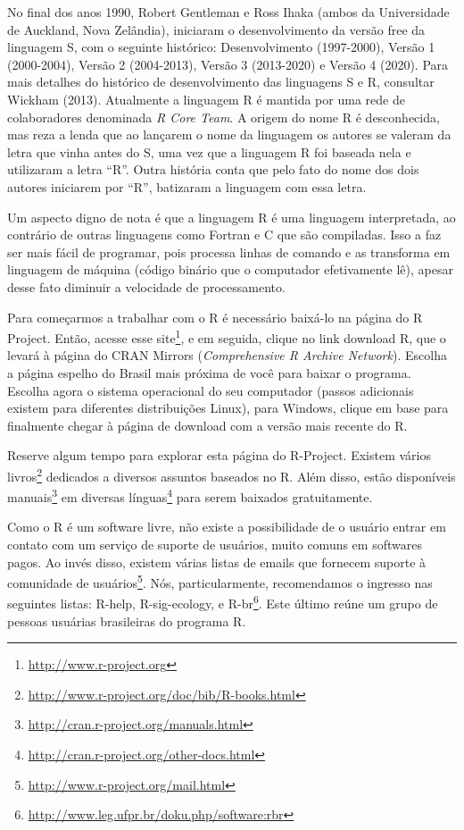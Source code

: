 \documentclass[
]{book}
\renewcommand{\href}[2]{#2\footnote{\url{#1}}}
\begin{document}
No final dos anos 1990, Robert Gentleman e Ross Ihaka (ambos da Universidade de Auckland, Nova Zelândia), iniciaram o desenvolvimento da versão free da linguagem S, com o seguinte histórico: Desenvolvimento (1997-2000), Versão 1 (2000-2004), Versão 2 (2004-2013), Versão 3 (2013-2020) e Versão 4 (2020). Para mais detalhes do histórico de desenvolvimento das linguagens S e R, consultar Wickham (2013). Atualmente a linguagem R é mantida por uma rede de colaboradores denominada \emph{R Core Team}. A origem do nome R é desconhecida, mas reza a lenda que ao lançarem o nome da linguagem os autores se valeram da letra que vinha antes do S, uma vez que a linguagem R foi baseada nela e utilizaram a letra ``R''. Outra história conta que pelo fato do nome dos dois autores iniciarem por ``R'', batizaram a linguagem com essa letra.

Um aspecto digno de nota é que a linguagem R é uma linguagem interpretada, ao contrário de outras linguagens como Fortran e C que são compiladas. Isso a faz ser mais fácil de programar, pois processa linhas de comando e as transforma em linguagem de máquina (código binário que o computador efetivamente lê), apesar desse fato diminuir a velocidade de processamento.

Para começarmos a trabalhar com o R é necessário baixá-lo na página do R Project. Então, acesse esse \href{http://www.r-project.org}{site}, e em seguida, clique no link download R, que o levará à página do CRAN Mirrors (\emph{Comprehensive R Archive Network}). Escolha a página espelho do Brasil mais próxima de você para baixar o programa. Escolha agora o sistema operacional do seu computador (passos adicionais existem para diferentes distribuições Linux), para Windows, clique em base para finalmente chegar à página de download com a versão mais recente do R.

Reserve algum tempo para explorar esta página do R-Project. Existem vários \href{http://www.r-project.org/doc/bib/R-books.html}{livros} dedicados a diversos assuntos baseados no R. Além disso, estão disponíveis \href{http://cran.r-project.org/manuals.html}{manuais} em \href{http://cran.r-project.org/other-docs.html}{diversas línguas} para serem baixados gratuitamente.

Como o R é um software livre, não existe a possibilidade de o usuário entrar em contato com um serviço de suporte de usuários, muito comuns em softwares pagos. Ao invés disso, existem várias listas de emails que fornecem suporte à \href{http://www.r-project.org/mail.html}{comunidade de usuários}. Nós, particularmente, recomendamos o ingresso nas seguintes listas: R-help, R-sig-ecology, e \href{http://www.leg.ufpr.br/doku.php/software:rbr}{R-br}. Este último reúne um grupo de pessoas usuárias brasileiras do programa R.
\end{document}
